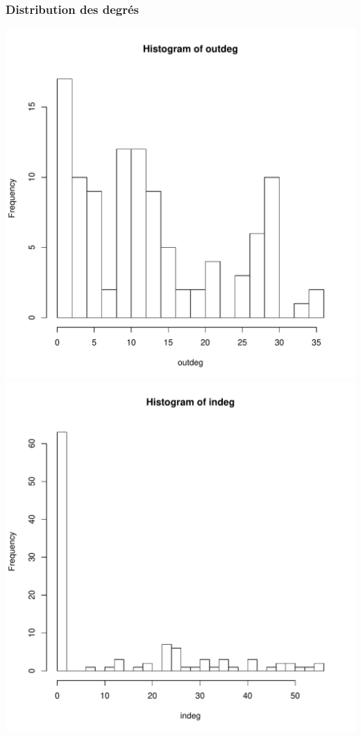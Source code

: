 \documentclass[nopagenumber,9pt]{beamer}
\begin{document}
\begin{frame}
 \frametitle{Distribution des degrés}
 
 \begin{center}
\includegraphics[scale=.3]{plots/chilean_outdeg.pdf}  
\includegraphics[scale=.3]{plots/chilean_intdeg.pdf}
\end{center}

\end{frame}
\end{document}
